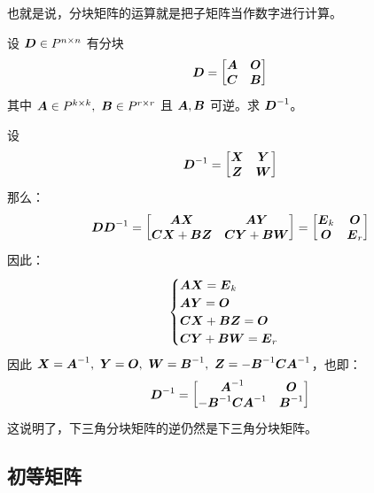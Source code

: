 也就是说，分块矩阵的运算就是把子矩阵当作数字进行计算。

\begin{example}
	设 $\boldsymbol{D} \in P^{n \times n}$ 有分块
	$$
	\boldsymbol{D} = \begin{bmatrix}
		\boldsymbol{A} & \boldsymbol{O} \\
		\boldsymbol{C} & \boldsymbol{B}
	\end{bmatrix}
	$$
	其中 $\boldsymbol{A} \in P^{k \times k},\ \boldsymbol{B} \in P^{r \times r}$ 且 $\boldsymbol{A}, \boldsymbol{B}$ 可逆。求 $\boldsymbol{D}^{-1}$。

	\begin{solution}
		设
		$$
		\boldsymbol{D}^{-1} = \begin{bmatrix}
			\boldsymbol{X} & \boldsymbol{Y} \\
			\boldsymbol{Z} & \boldsymbol{W}
		\end{bmatrix}
		$$
		那么：
		$$
		\boldsymbol{D} \boldsymbol{D}^{-1} = \begin{bmatrix}
			\boldsymbol{A} \boldsymbol{X} & \boldsymbol{A} \boldsymbol{Y} \\
			\boldsymbol{C} \boldsymbol{X} + \boldsymbol{B} \boldsymbol{Z} & \boldsymbol{C} \boldsymbol{Y} + \boldsymbol{B} \boldsymbol{W}
		\end{bmatrix} = \begin{bmatrix}
			\boldsymbol{E}_k & \boldsymbol{O} \\
			\boldsymbol{O} & \boldsymbol{E}_r
		\end{bmatrix}
		$$
		因此：
		$$
		\begin{cases}
			\boldsymbol{A} \boldsymbol{X} = \boldsymbol{E}_k \\
			\boldsymbol{A} \boldsymbol{Y} = \boldsymbol{O} \\
			\boldsymbol{C} \boldsymbol{X} + \boldsymbol{B} \boldsymbol{Z} = \boldsymbol{O} \\
			\boldsymbol{C} \boldsymbol{Y} + \boldsymbol{B} \boldsymbol{W} = \boldsymbol{E}_r
		\end{cases}
		$$
		因此 $\matr{X} = \matr{A}^{-1},\ \matr{Y} = \matr{O},\ \matr{W} = \matr{B}^{-1},\ \matr{Z} = -\matr{B}^{-1} \matr{C} \matr{A}^{-1}$，也即：
		$$
		\boldsymbol{D}^{-1} = \begin{bmatrix}
			\boldsymbol{A}^{-1} & \boldsymbol{O} \\
			-\boldsymbol{B}^{-1} \boldsymbol{C} \boldsymbol{A}^{-1} & \boldsymbol{B}^{-1}
		\end{bmatrix}
		$$
		这说明了，下三角分块矩阵的逆仍然是下三角分块矩阵。
	\end{solution}
\end{example}

\subsection{初等矩阵}

